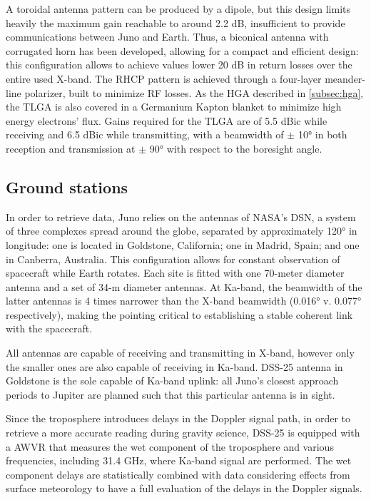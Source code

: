 A toroidal antenna pattern can be produced by a dipole, but this design limits heavily the maximum gain reachable to around 2.2 dB, insufficient to provide communications between Juno and Earth. Thus, a biconical antenna with corrugated horn has been developed, allowing for a compact and efficient design: this configuration allows to achieve values lower 20 dB in return losses over the entire used X-band\cite{telecommunication_antennas}. 
The RHCP pattern is achieved through a four-layer meander-line polarizer, built to minimize RF losses. As the HGA described in \autoref{subsec:hga}, the TLGA is also covered in a Germanium Kapton blanket to minimize high energy electrons' flux. Gains required for the TLGA are of 5.5 dBic while receiving and 6.5 dBic while transmitting, with a beamwidth of $\pm$ 10° in both reception and transmission at $\pm$ 90° with respect to the boresight angle\cite{juno_telecommunication}. 

\subsection{Ground stations}
\label{subsec:gs}

In order to retrieve data, Juno relies on the antennas of NASA's DSN, a system of three complexes spread around the globe, separated by approximately 120° in longitude: one is located in Goldstone, California; one in Madrid, Spain; and one in Canberra, Australia. This configuration allows for constant observation of spacecraft while Earth rotates\cite{juno_telecommunication}. Each site is fitted with one 70-meter diameter antenna and a set of 34-m diameter antennas. At Ka-band, the beamwidth of the latter antennas is 4 times narrower than the X-band beamwidth (0.016° v. 0.077° respectively), making the pointing critical to establishing a stable coherent link with the spacecraft. 

All antennas are capable of receiving and transmitting in X-band, however only the smaller ones are also capable of receiving in Ka-band. DSS-25 antenna in Goldstone is the sole capable of Ka-band uplink: all Juno's closest approach periods to Jupiter are planned such that this particular antenna is in sight.

Since the troposphere introduces delays in the Doppler signal path, in order to retrieve a more accurate reading during gravity science, DSS-25 is equipped with a AWVR that measures the wet component of the troposphere and various frequencies, including 31.4 GHz, where Ka-band signal are performed. The wet component delays are statistically combined with data considering effects from surface meteorology to have a full evaluation of the delays in the Doppler signals\cite{calibration_performance}. 

